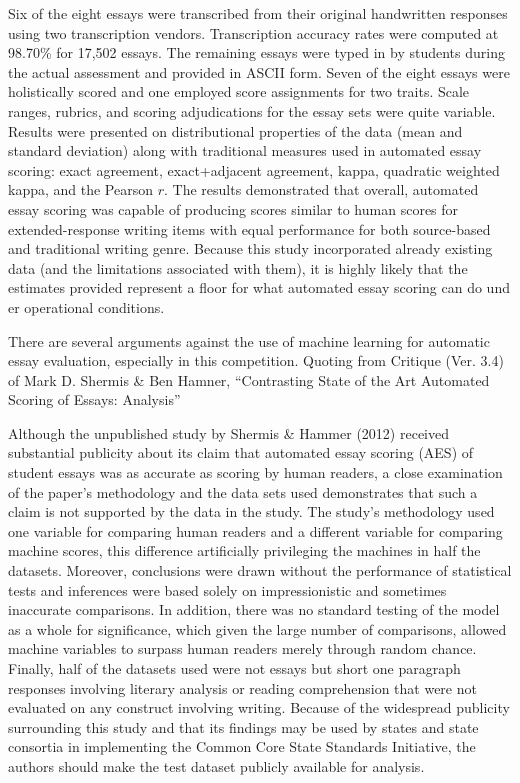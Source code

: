 \documentclass[BTech]{nitkdiss}
\begin{document}
\begin{displayquote}
Six of the eight essays were transcribed from their original handwritten responses using two transcription vendors. Transcription accuracy rates were computed at 98.70\% for 17,502 essays.  The remaining essays were typed in by students during the actual assessment and provided in ASCII form. Seven of the eight essays were holistically scored and one employed score assignments for two traits. Scale ranges, rubrics, and scoring adjudications for the essay sets were quite variable. Results were presented on distributional properties of the data (mean and standard deviation) along with traditional measures used in automated essay scoring: exact agreement, exact+adjacent agreement, kappa, quadratic weighted kappa, and the Pearson $r$. The results demonstrated that overall, automated essay scoring was capable of producing scores similar to human scores for extended-response writing items with equal performance for both source-based and traditional writing genre. Because this study incorporated already existing data (and the limitations associated with them), it is highly likely that the estimates provided represent a floor for what automated essay scoring can do und
er operational conditions.
\end{displayquote}

There are several arguments against the use of machine learning for automatic essay evaluation, especially in this competition. Quoting from Critique (Ver. 3.4) of Mark D. Shermis \& Ben Hamner, “Contrasting State of the Art Automated Scoring of Essays: Analysis”

\begin{displayquote}
Although the unpublished study by Shermis \& Hammer (2012) received substantial publicity about its claim that automated essay scoring (AES) of student essays was as accurate as scoring by human readers, a close examination of the paper’s methodology and the data sets used demonstrates that such a claim is not supported by the data in the study. The study’s methodology used one variable for comparing human readers and a different variable for comparing machine scores, this difference artificially privileging the machines in half the datasets. Moreover, conclusions were drawn without the performance of statistical tests and inferences were based solely on impressionistic and sometimes inaccurate comparisons. In addition, there was no standard testing of the model as a whole for significance, which given the large number of comparisons, allowed machine variables to surpass human readers merely through random chance. Finally, half of the datasets used were not essays but short one paragraph responses involving literary analysis or reading comprehension that were not evaluated on any construct involving writing.  Because of the widespread publicity surrounding this study and that its findings may be used by states and state consortia in implementing the Common Core State Standards Initiative, the authors should make the test dataset publicly available for analysis.
\end{displayquote}
\end{document}
